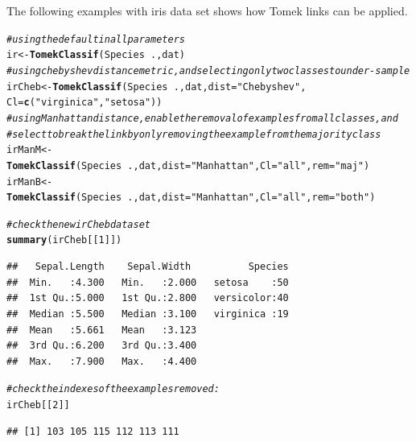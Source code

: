 \documentclass[10pt,a4paper]{article}\usepackage[]{graphicx}\usepackage[]{color}
\makeatletter
\newcommand{\hlnum}[1]{\textcolor[rgb]{0.686,0.059,0.569}{#1}}%
\newcommand{\hlstr}[1]{\textcolor[rgb]{0.192,0.494,0.8}{#1}}%
\newcommand{\hlcom}[1]{\textcolor[rgb]{0.678,0.584,0.686}{\textit{#1}}}%
\newcommand{\hlopt}[1]{\textcolor[rgb]{0,0,0}{#1}}%
\newcommand{\hlstd}[1]{\textcolor[rgb]{0.345,0.345,0.345}{#1}}%
\newcommand{\hlkwb}[1]{\textcolor[rgb]{0.69,0.353,0.396}{#1}}%
\newcommand{\hlkwc}[1]{\textcolor[rgb]{0.333,0.667,0.333}{#1}}%
\newcommand{\hlkwd}[1]{\textcolor[rgb]{0.737,0.353,0.396}{\textbf{#1}}}%
\newenvironment{kframe}{%
 \def\at@end@of@kframe{}%
 \ifinner\ifhmode%
  \def\at@end@of@kframe{\end{minipage}}%
  \begin{minipage}{\columnwidth}%
 \fi\fi%
 \def\FrameCommand##1{\hskip\@totalleftmargin \hskip-\fboxsep
 \colorbox{shadecolor}{##1}\hskip-\fboxsep
     \hskip-\linewidth \hskip-\@totalleftmargin \hskip\columnwidth}%
 \MakeFramed {\advance\hsize-\width
   \@totalleftmargin\z@ \linewidth\hsize
   \@setminipage}}%
 {\par\unskip\endMakeFramed%
 \at@end@of@kframe}
\newenvironment{knitrout}{}{} %
\makeatother
\begin{document}
The following examples with iris data set shows how Tomek links can be applied.


\begin{knitrout}\footnotesize
{}\color{fgcolor}\begin{kframe}
\begin{alltt}
\hlcom{# using the default in all parameters}
  \hlstd{ir} \hlkwb{<-} \hlkwd{TomekClassif}\hlstd{(Species}\hlopt{~}\hlstd{., dat)}
\hlcom{# using chebyshev distance metric, and selecting only two classes to under-sample}
  \hlstd{irCheb} \hlkwb{<-} \hlkwd{TomekClassif}\hlstd{(Species}\hlopt{~}\hlstd{., dat,} \hlkwc{dist}\hlstd{=}\hlstr{"Chebyshev"}\hlstd{,}
                         \hlkwc{Cl}\hlstd{=}\hlkwd{c}\hlstd{(}\hlstr{"virginica"}\hlstd{,} \hlstr{"setosa"}\hlstd{))}
\hlcom{# using Manhattan distance, enable the removal of examples from all classes, and}
\hlcom{# select to break the link by only removing the example from the majority class}
  \hlstd{irManM} \hlkwb{<-} \hlkwd{TomekClassif}\hlstd{(Species}\hlopt{~}\hlstd{., dat,} \hlkwc{dist}\hlstd{=}\hlstr{"Manhattan"}\hlstd{,} \hlkwc{Cl}\hlstd{=}\hlstr{"all"}\hlstd{,} \hlkwc{rem}\hlstd{=}\hlstr{"maj"}\hlstd{)}
  \hlstd{irManB} \hlkwb{<-} \hlkwd{TomekClassif}\hlstd{(Species}\hlopt{~}\hlstd{., dat,} \hlkwc{dist}\hlstd{=}\hlstr{"Manhattan"}\hlstd{,} \hlkwc{Cl}\hlstd{=}\hlstr{"all"}\hlstd{,} \hlkwc{rem}\hlstd{=}\hlstr{"both"}\hlstd{)}

\hlcom{# check the new irCheb data set}
\hlkwd{summary}\hlstd{(irCheb[[}\hlnum{1}\hlstd{]])}
\end{alltt}
\begin{verbatim}
##   Sepal.Length    Sepal.Width          Species  
##  Min.   :4.300   Min.   :2.000   setosa    :50  
##  1st Qu.:5.000   1st Qu.:2.800   versicolor:40  
##  Median :5.500   Median :3.100   virginica :19  
##  Mean   :5.661   Mean   :3.123                  
##  3rd Qu.:6.200   3rd Qu.:3.400                  
##  Max.   :7.900   Max.   :4.400
\end{verbatim}
\begin{alltt}
\hlcom{# check the indexes of the examples removed:}
\hlstd{irCheb[[}\hlnum{2}\hlstd{]]}
\end{alltt}
\begin{verbatim}
## [1] 103 105 115 112 113 111
\end{verbatim}
\end{kframe}
\end{knitrout}
\end{document}
